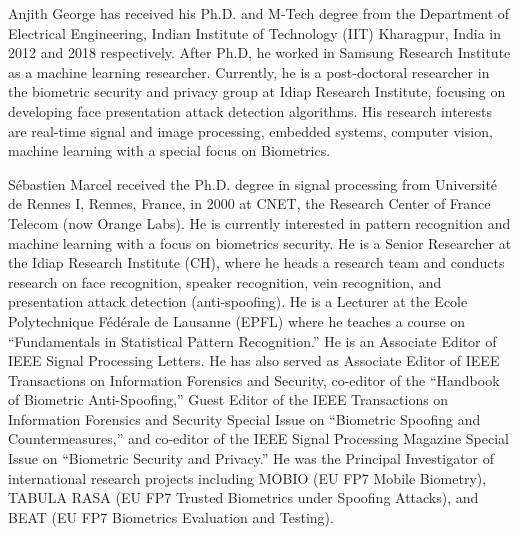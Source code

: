 \documentclass[journal]{IEEEtran}
\begin{document}
\begin{IEEEbiography}
  {Anjith George}
has received his Ph.D. and M-Tech degree from the Department of Electrical Engineering, Indian Institute of Technology (IIT) Kharagpur, India in 2012 and 2018 respectively. After Ph.D, he worked in Samsung Research Institute as a machine learning researcher. Currently, he is a post-doctoral researcher in the biometric security and privacy group at Idiap Research Institute, focusing on developing face presentation attack detection algorithms. His research interests are real-time signal and image processing, embedded systems, computer vision, machine learning with a special focus on Biometrics.
\end{IEEEbiography}
\begin{IEEEbiography}
 {S{\'e}bastien Marcel}
received the Ph.D. degree in signal processing from Universit\'{e} de Rennes I, Rennes, France, in 2000 at CNET, the Research Center of France Telecom (now Orange Labs). He is currently interested in pattern recognition and machine learning with a focus on biometrics security. He is a Senior Researcher at the Idiap Research Institute (CH), where he heads a research team and conducts research on face recognition, speaker recognition, vein recognition, and presentation attack detection (anti-spoofing). He is a Lecturer at the Ecole Polytechnique F\'{e}d\'{e}rale de Lausanne (EPFL) where he teaches a course on ``Fundamentals in Statistical Pattern Recognition.'' He is an Associate Editor of IEEE Signal Processing Letters. He has also served as Associate Editor of IEEE Transactions on Information Forensics and Security, co-editor of the ``Handbook of Biometric Anti-Spoofing,'' Guest Editor of the IEEE Transactions on Information Forensics and Security Special Issue on ``Biometric Spoofing and Countermeasures,'' and co-editor of the IEEE Signal Processing Magazine Special Issue on ``Biometric Security and Privacy.'' He was the Principal Investigator of international research projects including MOBIO (EU FP7 Mobile Biometry), TABULA RASA (EU FP7 Trusted Biometrics under Spoofing Attacks), and BEAT (EU FP7 Biometrics Evaluation and Testing).
\end{IEEEbiography}
\vfill
\end{document}
